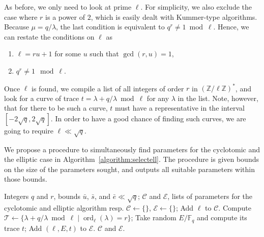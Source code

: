 \documentclass[12pt]{article}
\theoremstyle{plain}
\theoremstyle{definition}
\DeclareMathOperator{\order}{ord} %
\def\Z{\ensuremath{\mathbb{Z}}}
\def\F{\ensuremath{\mathbb{F}}}
\newcounter{algorithm}
\begin{document}
As before, we only need to look at prime $\ell$. For simplicity, we
also exclude the case where $r$ is a power of $2$, which is easily
dealt with Kummer-type algorithms. Because $\mu=q/\lambda$, the last
condition is equivalent to $q^r\ne1\bmod\ell$. Hence, we can restate
the conditions on $\ell$ as
\begin{enumerate}
\item $\ell = ru+1$ for some $u$ such that $\gcd(r,u)=1$,
\item $q^r\ne1\mod\ell$.
\end{enumerate}
Once $\ell$ is found, we compile a list of all integers of order $r$
in $(\Z/\ell\Z)^\ast$, and look for a curve of trace
$t=\lambda+q/\lambda\bmod\ell$ for any $\lambda$ in the list. Note,
however, that for there to be such a curve, $t$ must have a
representative in the interval $[-2\sqrt{q},2\sqrt{q}]$. In order to
have a good chance of finding such curves, we are going to require
$\ell\ll\sqrt{q}$.

We propose a procedure to simultaneously find parameters for the
cyclotomic and the elliptic case in
Algorithm~\ref{algorithm:selectell}. The procedure is given bounds on
the size of the parameters sought, and outputs all suitable parameters
within those bounds.

\begin{algorithm}
    \label{algorithm:selectell}
    \begin{algorithmic}[1]
      \REQUIRE Integers $q$ and $r$, bounds $\bar{u}$, $\bar{s}$, and $\bar{e}\ll\sqrt{q}$;
      \ENSURE $\mathcal{C}$ and $\mathcal{E}$, lists of parameters for the cyclotomic and elliptic algorithm resp.
      \STATE $\mathcal{C}\leftarrow\{\}$, $\mathcal{E}\leftarrow\{\}$;
      \IF{$\order_\ell(q)=rs$ with $s\le\bar{s}$ and $\gcd(rs,u/s)=1$}
      \STATE Add $\ell$ to $\mathcal{C}$.
      \ENDIF
      \STATE Compute $\mathcal{T} \leftarrow \{\lambda + q/\lambda \bmod\ell \;|\; \order_\ell(\lambda)=r\}$;
      \REPEAT
      \STATE Take random $E/\F_q$ and compute its trace $t$;
      \STATE Add $(\ell,E,t)$ to $\mathcal{E}$.
      \ENDIF
      \ENDIF
      \ENDFOR
      \RETURN $\mathcal{C}$ and $\mathcal{E}$.
    \end{algorithmic}
\end{algorithm}
\end{document}

